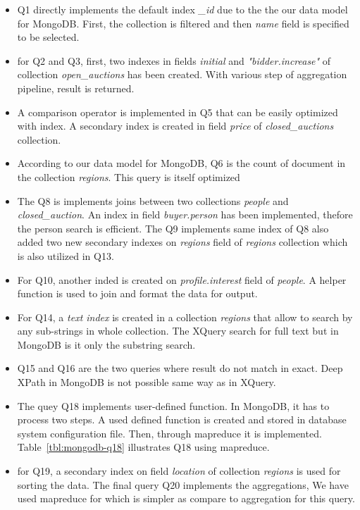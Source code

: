\begin{itemize}
\item Q1 directly implements the default index \textit{\_id} due to the the our data model for MongoDB. First, the collection is filtered and then \textit{name} field is specified to be selected. 

\item for Q2 and Q3, first, two indexes in fields \textit{initial} and \textit{"bidder.increase"} of collection \textit{open\_auctions}  has been created. With various step of aggregation pipeline, result is returned.

\item A comparison operator is implemented in Q5 that can be easily optimized with index. A secondary index is created in field \textit{price} of \textit{closed\_auctions} collection. 
\item According to our data model for MongoDB, Q6 is the count of document in the collection \textit{regions}. This query is itself optimized
\item The Q8 is implements joins between two collections \textit{people} and \textit{closed\_auction}. An index in field \textit{buyer.person} has been implemented, thefore the person search is efficient. The Q9 implements same index of Q8 also added two new secondary indexes on \textit{regions} field of \textit{regions} collection which is also utilized in Q13.
\item For Q10, another inded is created on \textit{profile.interest} field of \textit{people}. A helper function is used to join and format the data for output.
\item For Q14, a \textit{text index} is created in a collection \textit{regions} that allow to search by any sub-strings in whole collection. The XQuery search for full text but in MongoDB is it only the substring search.

\item Q15 and Q16 are the two queries where result do not match in exact. Deep XPath in MongoDB is not possible same way as in XQuery. 

\item The quey Q18 implements user-defined function. In MongoDB, it has to process two steps. A used defined function is created and stored in database system configuration file. Then, through mapreduce it is implemented. Table~\ref{tbl:mongodb-q18} illustrates Q18 using mapreduce.

\item for Q19, a secondary index on field \textit{location} of collection \textit{regions} is used for sorting the data. The final query Q20 implements the aggregations, We have used mapreduce for which is simpler as compare to aggregation for this query.

\end{itemize}


